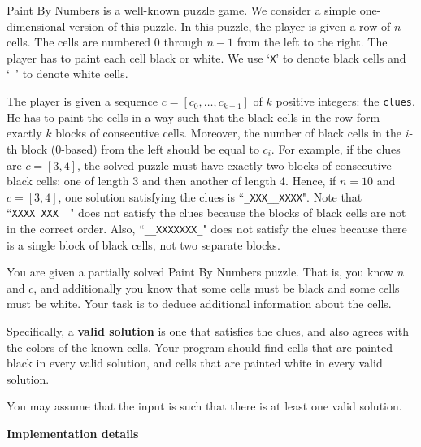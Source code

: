 Paint By Numbers is a well-known puzzle game. We consider a simple one-dimensional version of this puzzle. 
In this puzzle, the player is given a row of $n$ cells. The cells are numbered $0$ through $n - 1$ from the left to the right.
The player has to paint each cell  black or white. We use `\texttt{X}' to denote black cells and `\texttt{\_}' to denote white cells.

The player is given a sequence $c = [c_0, \ldots, c_{k - 1}]$ of $k$ positive integers: the \texttt{clues}. 
He has to paint the cells in a way such that the black cells in the row form exactly $k$ blocks of consecutive cells.
Moreover, the number of black cells in the $i$-th block ($0$-based) from the left should be equal to $c_i$. For example,
if the clues are $c = [3, 4]$, the solved puzzle must have exactly two blocks of consecutive black cells: one of length 3 and 
then another of length 4. Hence, if $n = 10$ and $c = [3, 4]$, one solution satisfying the clues is ``\texttt{\_XXX\_\_XXXX}". Note that
``\texttt{XXXX\_XXX\_\_}" does not satisfy the clues because the blocks of black cells are not in the correct order. Also, ``\texttt{\_\_XXXXXXX\_}" 
does not satisfy the clues because there is a single block of black cells, not two separate blocks.

You are given a partially solved Paint By Numbers puzzle. That is, you know $n$ and $c$, and additionally you know that some
cells must be black and some cells must be white. Your task is to deduce additional information about the cells.

Specifically, a \textbf{valid solution} is one that satisfies the clues, and also agrees with the colors of the known cells.
Your program should find cells that are painted black in every valid solution, and cells that are painted white in every
valid solution. 

You may assume that the input is such that there is at least one valid solution.

\textbf{Implementation details}

